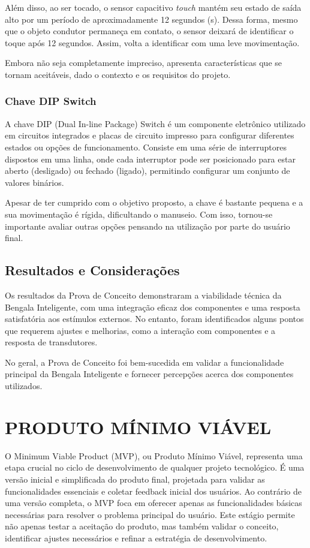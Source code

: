 Além disso, ao ser tocado, o sensor capacitivo \textit{touch} mantém seu estado de saída alto por um período de aproximadamente 12 segundos (s). Dessa forma, mesmo que o objeto condutor permaneça em contato, o sensor deixará de identificar o toque após 12 segundos. Assim, volta a identificar com uma leve movimentação. 

Embora não seja completamente impreciso, apresenta características que se tornam aceitáveis, dado o contexto e os requisitos do projeto.






\subsection{Chave DIP Switch}
A chave DIP (Dual In-line Package) Switch é um componente eletrônico utilizado em circuitos integrados e placas de circuito impresso para configurar diferentes estados ou opções de funcionamento. Consiste em uma série de interruptores dispostos em uma linha, onde cada interruptor pode ser posicionado para estar aberto (desligado) ou fechado (ligado), permitindo configurar um conjunto de valores binários.

Apesar de ter cumprido com o objetivo proposto, a chave é bastante pequena e a sua movimentação é rígida, dificultando o manuseio. Com isso, tornou-se importante avaliar outras opções pensando na utilização por parte do usuário final.







\section{Resultados e Considerações}

Os resultados da Prova de Conceito demonstraram a viabilidade técnica da Bengala Inteligente, com uma integração eficaz dos componentes e uma resposta satisfatória aos estímulos externos. No entanto, foram identificados alguns pontos que requerem ajustes e melhorias, como a interação com componentes e a resposta de transdutores.

No geral, a Prova de Conceito foi bem-sucedida em validar a funcionalidade principal da Bengala Inteligente e fornecer percepções acerca dos componentes utilizados.


\chapter{PRODUTO MÍNIMO VIÁVEL}
O Minimum Viable Product (MVP), ou Produto Mínimo Viável, representa uma etapa crucial no ciclo de desenvolvimento de qualquer projeto tecnológico. É uma versão inicial e simplificada do produto final, projetada para validar as funcionalidades essenciais e coletar feedback inicial dos usuários. Ao contrário de uma versão completa, o MVP foca em oferecer apenas as funcionalidades básicas necessárias para resolver o problema principal do usuário. Este estágio permite não apenas testar a aceitação do produto, mas também validar o conceito, identificar ajustes necessários e refinar a estratégia de desenvolvimento.

